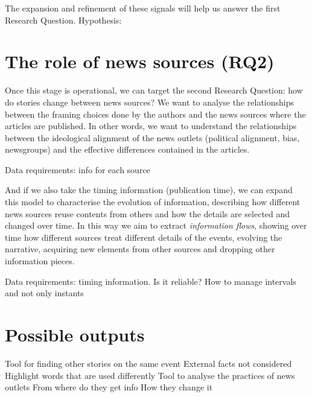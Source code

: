The expansion and refinement of these signals will help us answer the first Research Question.
Hypothesis: 



\section{The role of news sources (RQ2)}
\label{sec:prop_rq2}

Once this stage is operational, we can target the second Research Question: how do stories change between news sources?
We want to analyse the relationships between the framing choices done by the authors and the news sources where the articles are published. In other words, we want to understand the relationships between the ideological alignment of the news outlets (political alignment, bias, newsgroups) and the effective differences contained in the articles.

Data requirements: info for each source




And if we also take the timing information (publication time), we can expand this model to characterise the evolution of information, describing how different news sources reuse contents from others and how the details are selected and changed over time.
In this way we aim to extract \textit{information flows}, showing over time how different sources treat different details of the events, evolving the narrative, acquiring new elements from other sources and dropping other information pieces.\textbf{}

Data requirements: timing information.
Is it reliable? How to manage intervals and not only instants




\section{Possible outputs}


Tool for finding other stories on the same event
External facts not considered
Highlight words that are used differently
Tool to analyse the practices of news outlets
From where do they get info
How they change it
